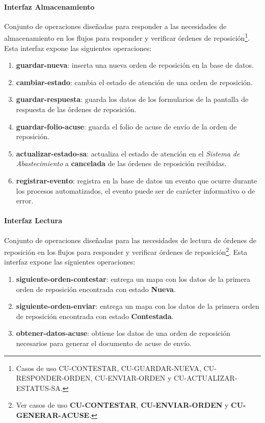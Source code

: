 \paragraph{\indent Interfaz Almacenamiento\\}
Conjunto de operaciones diseñadas para responder a las necesidades de almacenamiento en los flujos para responder y verificar órdenes de reposición\footnote{Casos de uso CU-CONTESTAR, CU-GUARDAR-NUEVA, CU-RESPONDER-ORDEN, CU-ENVIAR-ORDEN y CU-ACTUALIZAR-ESTATUS-SA.}. Esta interfaz expone las siguientes operaciones:
\begin{enumerate}
	\item \textbf{guardar-nueva}: inserta una nueva orden de reposición en la base de datos.
	\item \textbf{cambiar-estado}: cambia el estado de atención de una orden de reposición.
	\item \textbf{guardar-respuesta}: guarda los datos de los formularios de la pantalla de respuesta de las órdenes de reposición.
	\item \textbf{guardar-folio-acuse}: guarda el folio de acuse de envío de la orden de reposición.
	\item \textbf{actualizar-estado-sa}: actualiza el estado de atención en el \textit{Sistema de Abastecimiento} a \textbf{cancelada} de las órdenes de reposición recibidas.
	\item \textbf{registrar-evento}: registra en la base de datos un evento que ocurre durante los procesos automatizados, el evento puede ser de carácter informativo o de error.
\end{enumerate}

\paragraph{\indent Interfaz Lectura\\}
Conjunto de operaciones diseñadas para las necesidades de lectura de órdenes de reposición en los flujos para responder y verificar órdenes de reposición\footnote{Ver casos de uso \textbf{CU-CONTESTAR}, \textbf{CU-ENVIAR-ORDEN} y \textbf{CU-GENERAR-ACUSE}.}. Esta interfaz expone las siguientes operaciones:
\begin{enumerate}
	\item \textbf{siguiente-orden-contestar}: entrega un mapa con los datos de la primera orden de reposición encontrada con estado \textbf{Nueva}.
	\item \textbf{siguiente-orden-enviar}: entrega un mapa con los datos de la primera orden de reposición encontrada con estado \textbf{Contestada}.
	\item \textbf{obtener-datos-acuse}: obtiene los datos de una orden de reposición necesarios para generar el documento de acuse de envío.
\end{enumerate}

